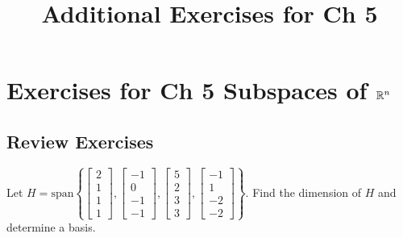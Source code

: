 \documentclass{ximera}
\title{Additional Exercises for Ch 5} \license{CC BY-NC-SA 4.0}
\begin{document}
\begin{abstract}
\end{abstract}
\maketitle

\section*{Exercises for Ch 5 Subspaces of $\mathbb{R}^n$}

\subsection*{Review Exercises}

\begin{problem}\label{prb:5.1} Let $H = \mbox{span}\left\{ \left[
\begin{array}{r}
2 \\
1 \\
1 \\
1
\end{array}
\right] ,\left[
\begin{array}{r}
-1 \\
0 \\
-1 \\
-1
\end{array}
\right] ,\left[
\begin{array}{r}
5 \\
2 \\
3 \\
3
\end{array}
\right] ,\left[
\begin{array}{r}
-1 \\
1 \\
-2 \\
-2
\end{array}
\right] \right\} .$ Find the dimension of $H$ and determine a basis.
\end{problem}
\end{document}
